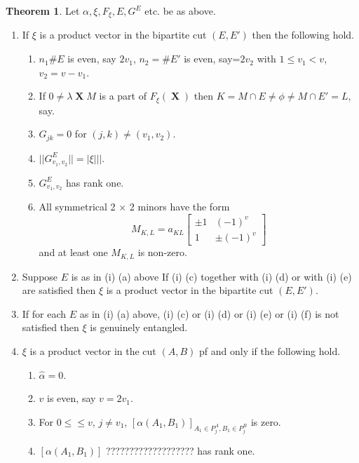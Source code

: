 \documentclass[a4paper,12pt]{article}
\DeclareMathOperator{\x}{\mathrm{X}}
\theoremstyle{definition}
\theoremstyle{underlinethm}
\newtheorem{thm}{Theorem}[section]
\theoremstyle{definition}
\begin{document}
\begin{thm}\label{thm-4.2}
Let $\alpha, \xi, F_{\xi}, E , G^{E}$ etc. be as above.
\begin{enumerate}[label=(\roman*)]
 \item If $\xi$ is a product vector in the bipartite cut $(E, E')$ then the following hold.
\begin{enumerate}[label= (\alph*)]
\item $n_{1}\# E$ is even, say $2v_{1}$, $n_{2}= \# E'$ is even, say=$2v_{2}$ with $1 \leq v_{1} < v$, $v_{2}= v-v_{1}$.

\item If $0 \neq \lambda \boldsymbol{\x}M$ is a part of $F_{\xi}(\boldsymbol{\x})$ then $K = M \cap E \neq  \phi \neq M \cap E' = L$, say.

\item $G_{jk} =0$ for $(j,k) \neq (v_{1}, v_{2})$.

\item $||G_{v_{1}, v_{2}}^{E}||= |\xi |||$.

\item $G_{v_{1}, v_{2}}^{E}$ has rank one.

\item All symmetrical 2 $\times$ 2 minors have the form 
$$
M_{K, L} = a_{K L} \begin{bmatrix}\pm 1 & (-1)^{v}\\ 1  & \pm(-1)^{v} \end{bmatrix}
$$
and at least one $M_{K, L}$ is non-zero.
\end{enumerate}

\item Suppose $E$ is as in (i) (a) above If (i) (c) together with (i) (d) or with (i) (e) are satisfied then $\xi$ is a product vector in the bipartite cut $(E, E')$.

\item If for each $E$ as in (i) (a) above, (i) (c) or (i) (d) or (i) (e) or (i) (f) is not satisfied then $\xi$ is genuinely entangled.

\item $\xi$ is a product vector in the cut $(A, B)$ pf and only if the following hold.

\begin{enumerate}[label= (\alph*)]
\item $\hat{\alpha} = 0$.

\item $v$ is even, say $v=2v_{1}$.

\item For $0 \leq  \leq v$, $j \neq v_{1}$, $[\alpha(A_{1}, B_{1})]_{A_{1} \in P_{j}^{A}, B_{1}\in P_{j}^{B}}$ is zero.

\item $[\alpha(A_{1}, B_{1})]$ ??????????????????? has rank one.

\end{enumerate}

 
\end{enumerate}



\end{thm}
\end{document}
